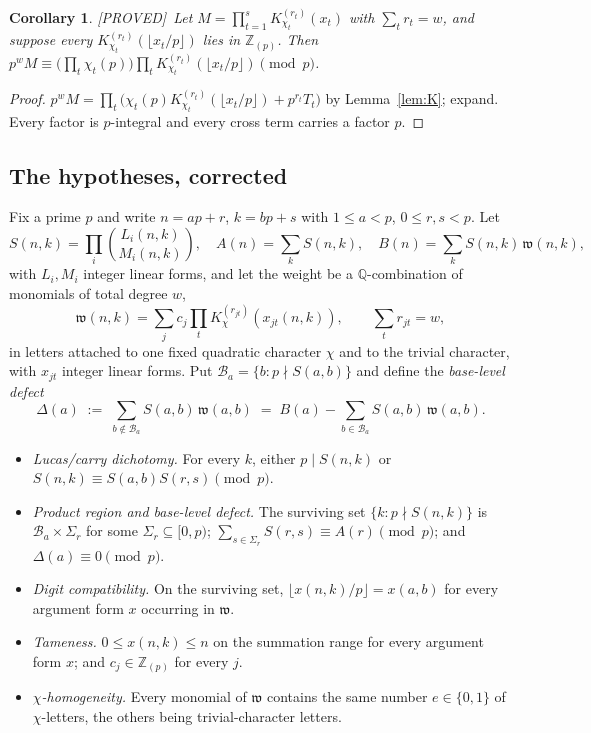\documentclass[11pt,reqno]{amsart}
\theoremstyle{plain}
\newtheorem{corollary}[theorem]{Corollary}
\theoremstyle{definition}
\theoremstyle{remark}
\newcommand{\Z}{\mathbb{Z}}
\newcommand{\Q}{\mathbb{Q}}
\newcommand{\Zp}{\Z_{(p)}}
\newcommand{\bin}[2]{\binom{#1}{#2}}
\newcommand{\KK}[3]{K^{(#1)}_{#2}\!\left(#3\right)}
\newcommand{\Proved}{\textup{\textsf{[PROVED]}}}
\numberwithin{equation}{section}
\begin{document}
\begin{corollary}\label{cor:K2}
\Proved\ Let $M=\prod_{t=1}^{s}\KK{r_t}{\chi_t}{x_t}$ with $\sum_t r_t=w$, and suppose every
$\KK{r_t}{\chi_t}{\lfloor x_t/p\rfloor}$ lies in $\Zp$. Then
$p^{w}M\equiv\bigl(\prod_t\chi_t(p)\bigr)\prod_t\KK{r_t}{\chi_t}{\lfloor x_t/p\rfloor}
 \pmod p$.
\end{corollary}

\begin{proof}
$p^wM=\prod_t\bigl(\chi_t(p)\KK{r_t}{\chi_t}{\lfloor x_t/p\rfloor}+p^{r_t}T_t\bigr)$ by
Lemma~\ref{lem:K}; expand. Every factor is $p$-integral and every cross term carries a
factor $p$.
\end{proof}

\subsection{The hypotheses, corrected}
Fix a prime $p$ and write $n=ap+r$, $k=bp+s$ with $1\le a<p$, $0\le r,s<p$. Let
\[
  S(n,k)=\prod_i\bin{L_i(n,k)}{M_i(n,k)},\quad A(n)=\sum_kS(n,k),\quad
  B(n)=\sum_kS(n,k)\,\mathfrak w(n,k),
\]
with $L_i,M_i$ integer linear forms, and let the weight be a $\Q$-combination of monomials
of total degree $w$,
\begin{equation}\label{eq:weightshape}
  \mathfrak w(n,k)=\sum_j c_j\prod_t \KK{r_{jt}}{\chi}{x_{jt}(n,k)},\qquad
  \sum_t r_{jt}=w ,
\end{equation}
in letters attached to one fixed quadratic character $\chi$ and to the trivial character,
with $x_{jt}$ integer linear forms. Put $\mathcal B_a=\{b: p\nmid S(a,b)\}$ and define the
\emph{base-level defect}
\begin{equation}\label{eq:Delta}
  \Delta(a)\;:=\;\sum_{b\notin\mathcal B_a}S(a,b)\,\mathfrak w(a,b)
  \;=\;B(a)-\sum_{b\in\mathcal B_a}S(a,b)\,\mathfrak w(a,b).
\end{equation}

\begin{itemize}[leftmargin=2.4em]
\item[(H1)] \emph{Lucas/carry dichotomy.} For every $k$, either $p\mid S(n,k)$ or
  $S(n,k)\equiv S(a,b)S(r,s)\pmod p$.
\item[(H2)] \emph{Product region and base-level defect.} The surviving set
  $\{k:p\nmid S(n,k)\}$ is $\mathcal B_a\times\Sigma_r$ for some $\Sigma_r\subseteq[0,p)$;
  $\sum_{s\in\Sigma_r}S(r,s)\equiv A(r)\pmod p$; and $\Delta(a)\equiv0\pmod p$.
\item[(H3)] \emph{Digit compatibility.} On the surviving set,
  $\lfloor x(n,k)/p\rfloor=x(a,b)$ for every argument form $x$ occurring in
  $\mathfrak w$.
\item[(H4)] \emph{Tameness.} $0\le x(n,k)\le n$ on the summation range for every argument
  form $x$; and $c_j\in\Zp$ for every $j$.
\item[(H5)] \emph{$\chi$-homogeneity.} Every monomial of $\mathfrak w$ contains the same
  number $e\in\{0,1\}$ of $\chi$-letters, the others being trivial-character letters.
\end{itemize}
\end{document}
